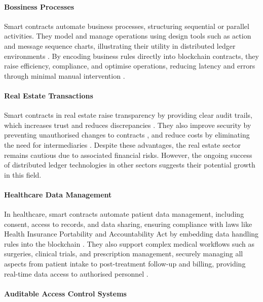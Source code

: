 \paragraph{Bossiness Processes}

Smart contracts automate business processes, structuring sequential or parallel activities. They model and manage operations using design tools such as action and message sequence charts, illustrating their utility in distributed ledger environments \cite{MagazzeniEtAl2017}. By encoding business rules directly into blockchain contracts, they raise efficiency, compliance, and optimise operations, reducing latency and errors through minimal manual intervention \cite{ChikovEtAl2023}.

\paragraph{Real Estate Transactions}

Smart contracts in real estate raise transparency by providing clear audit trails, which increases trust and reduces discrepancies \cite{LaarabiEtAl2022, MohantaEtAl2018}. They also improve security by preventing unauthorised changes to contracts \cite{UllahEtAl2023, LaarabiEtAl2022}, and reduce costs by eliminating the need for intermediaries \cite{UzairEtAl2018, MohantaEtAl2018}. Despite these advantages, the real estate sector remains cautious due to associated financial risks. However, the ongoing success of distributed ledger technologies in other sectors suggests their potential growth in this field.

\paragraph{Healthcare Data Management}

In healthcare, smart contracts automate patient data management, including consent, access to records, and data sharing, ensuring compliance with laws like Health Insurance Portability and Accountability Act by embedding data handling rules into the blockchain \cite{Khatoon2020}. They also support complex medical workflows such as surgeries, clinical trials, and prescription management, securely managing all aspects from patient intake to post-treatment follow-up and billing, providing real-time data access to authorised personnel \cite{Khatoon2020}.

\paragraph{Auditable Access Control Systems}

